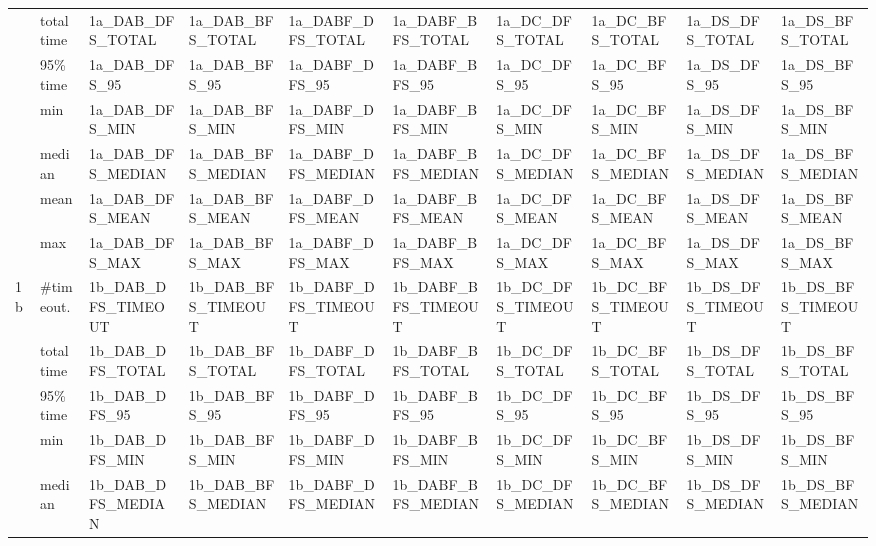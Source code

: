 \begin{table}
{\begin{tabular}{|l|l|l|l|l|l|l|l|l|l|}
                      & total time & 1a_DAB_DFS_TOTAL   & 1a_DAB_BFS_TOTAL   & 1a_DABF_DFS_TOTAL   & 1a_DABF_BFS_TOTAL   & 1a_DC_DFS_TOTAL   & 1a_DC_BFS_TOTAL   & 1a_DS_DFS_TOTAL   & 1a_DS_BFS_TOTAL  \\
                      & 95\% time  & 1a_DAB_DFS_95      & 1a_DAB_BFS_95      & 1a_DABF_DFS_95      & 1a_DABF_BFS_95      & 1a_DC_DFS_95      & 1a_DC_BFS_95      & 1a_DS_DFS_95      & 1a_DS_BFS_95  \\
\cline{2-10}
                      & min        & 1a_DAB_DFS_MIN     & 1a_DAB_BFS_MIN     & 1a_DABF_DFS_MIN     & 1a_DABF_BFS_MIN     & 1a_DC_DFS_MIN     & 1a_DC_BFS_MIN     & 1a_DS_DFS_MIN     & 1a_DS_BFS_MIN  \\
                      & median     & 1a_DAB_DFS_MEDIAN  & 1a_DAB_BFS_MEDIAN  & 1a_DABF_DFS_MEDIAN  & 1a_DABF_BFS_MEDIAN  & 1a_DC_DFS_MEDIAN  & 1a_DC_BFS_MEDIAN  & 1a_DS_DFS_MEDIAN  & 1a_DS_BFS_MEDIAN  \\
                      & mean       & 1a_DAB_DFS_MEAN    & 1a_DAB_BFS_MEAN    & 1a_DABF_DFS_MEAN    & 1a_DABF_BFS_MEAN    & 1a_DC_DFS_MEAN    & 1a_DC_BFS_MEAN    & 1a_DS_DFS_MEAN    & 1a_DS_BFS_MEAN  \\
                      & max        & 1a_DAB_DFS_MAX     & 1a_DAB_BFS_MAX     & 1a_DABF_DFS_MAX     & 1a_DABF_BFS_MAX     & 1a_DC_DFS_MAX     & 1a_DC_BFS_MAX     & 1a_DS_DFS_MAX     & 1a_DS_BFS_MAX  \\
\hline
\hline
\multirow{7}{*}{1b}   & \#timeout. & 1b_DAB_DFS_TIMEOUT & 1b_DAB_BFS_TIMEOUT & 1b_DABF_DFS_TIMEOUT & 1b_DABF_BFS_TIMEOUT & 1b_DC_DFS_TIMEOUT & 1b_DC_BFS_TIMEOUT & 1b_DS_DFS_TIMEOUT & 1b_DS_BFS_TIMEOUT  \\
                      & total time & 1b_DAB_DFS_TOTAL   & 1b_DAB_BFS_TOTAL   & 1b_DABF_DFS_TOTAL   & 1b_DABF_BFS_TOTAL   & 1b_DC_DFS_TOTAL   & 1b_DC_BFS_TOTAL   & 1b_DS_DFS_TOTAL   & 1b_DS_BFS_TOTAL    \\
                      & 95\% time  & 1b_DAB_DFS_95      & 1b_DAB_BFS_95      & 1b_DABF_DFS_95      & 1b_DABF_BFS_95      & 1b_DC_DFS_95      & 1b_DC_BFS_95      & 1b_DS_DFS_95      & 1b_DS_BFS_95       \\ 
\cline{2-10}
                      & min        & 1b_DAB_DFS_MIN     & 1b_DAB_BFS_MIN     & 1b_DABF_DFS_MIN     & 1b_DABF_BFS_MIN     & 1b_DC_DFS_MIN     & 1b_DC_BFS_MIN     & 1b_DS_DFS_MIN     & 1b_DS_BFS_MIN       \\
                      & median     & 1b_DAB_DFS_MEDIAN  & 1b_DAB_BFS_MEDIAN  & 1b_DABF_DFS_MEDIAN  & 1b_DABF_BFS_MEDIAN  & 1b_DC_DFS_MEDIAN  & 1b_DC_BFS_MEDIAN  & 1b_DS_DFS_MEDIAN  & 1b_DS_BFS_MEDIAN       \\

\end{tabular}}
\end{table}
